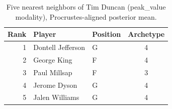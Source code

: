 \begin{table}[htbp]
  \centering\small
  \begin{tabular}{rllc}
    \toprule
    Rank & Player & Position & Archetype \\
    \midrule
    1 & Dontell Jefferson & G & 4 \\
    2 & George King & F & 4 \\
    3 & Paul Millsap & F & 3 \\
    4 & Jerome Dyson & G & 4 \\
    5 & Jalen Williams & G & 4 \\
    \bottomrule
  \end{tabular}
  \caption{Five nearest neighbors of Tim Duncan (peak_value modality), Procrustes-aligned posterior mean.}
  \label{tab:Tim_Duncan_neighbors_peak_value}
\end{table}

